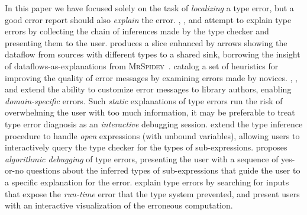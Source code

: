 In this paper we have focused solely on the task of \emph{localizing} a
type error, but a good error report should also \emph{explain} the
error.
%
\citet{Wand1986-nw}, \citet{Beaven1993-hb}, and \citet{Duggan1996-by}
attempt to explain type errors by collecting the chain of inferences
made by the type checker %
and presenting them to the user.
%
%
\citet{Gast2004-zd} produces a slice enhanced by arrows
showing the dataflow from sources with different types to a
shared sink, borrowing the insight of dataflows-as-explanations from
\textsc{MrSpidey}~\citep{Flanagan1996-bu}.
%
\citet{Hage2006-hc} catalog a set of heuristics for
improving the quality of error messages by examining errors made by
novices.
%
\citet{Heeren2003-db}, \citet{Christiansen2014-qc}, and
\citet{Serrano2016-oo} extend the ability to customize error messages to
library authors, enabling \emph{domain-specific} errors.
%
Such \emph{static} explanations of type errors run the risk of
overwhelming the user with too much information, it may be preferable to
treat type error diagnosis as an \emph{interactive} debugging session.
%
\citet{Bernstein1995-yj} extend the type inference procedure to handle
\emph{open} expressions (\ie with unbound variables), allowing users to
interactively query the type checker for the types of sub-expressions.
%
\citet{Chitil2001-td} proposes \emph{algorithmic debugging} of type
errors, presenting the user with a sequence of yes-or-no questions about
the inferred types of sub-expressions that guide the user to a specific
explanation for the error.
%
\citet{Seidel2016-ul} explain type errors by searching for inputs that
expose the \emph{run-time} error that the type system prevented, and
present users with an interactive visualization of the erroneous
computation.

%


